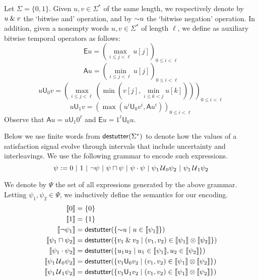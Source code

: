 Let $\Sigma = \{0,1\}$.
Given $u,v \in \Sigma^*$ of the same length, we respectively denote by $u \mathbin{\&} v$ the `bitwise and' operation, and by $\mathord{\sim} u$ the `bitwise negation' operation.
In addition, given a nonempty words $u,v \in \Sigma^*$ of length $\ell$, we define as auxiliary bitwise temporal operators as follows:
$$ \mathsf{E} u = \left( \max_{i \leq j < \ell} u[j] \right)_{0 \leq i < \ell} $$
$$ \mathsf{A} u = \left( \min_{i \leq j < \ell} u[j] \right)_{0 \leq i < \ell} $$
$$ u \mathsf{U}_0 v = \left( \max_{i \leq j < \ell} \left( \min \left( v[j], \min_{i \leq k < j} u[k] \right) \right) \right)_{0 \leq i < \ell} $$
$$ u \mathsf{U}_1 v = \left( \max \left( u^i \mathsf{U}_0 v^i, \mathsf{A} u^i \right) \right)_{0 \leq i < \ell} $$
Observe that $\mathsf{A} u = u \mathsf{U}_1 0^\ell$ and $\mathsf{E} u = 1^\ell \mathsf{U}_0 u$.

Below we use finite words from $\mathsf{destutter}(\Sigma^*)$ to denote how the values of a satisfaction signal evolve through intervals that include uncertainty and interleavings.
We use the following grammar to encode such expressions. 
$$ \psi := 0 ~|~ 1 ~|~ \lnot \psi ~|~ \psi \sqcap \psi  ~|~ \psi \cdot \psi ~|~ \psi_1 \,\mathcal{U}\,_{\!0} \psi_2 ~|~ \psi_1 \,\mathcal{U}\,_{\!1} \psi_2 $$  %

We denote by $\Psi$ the set of all expressions generated by the above grammar.
Letting $\psi_1, \psi_2 \in \Psi$, we inductively define the semantics for our encoding.
\begin{align*}
		\llbracket 0 \rrbracket &=  \{ 0 \} \\
		\llbracket 1 \rrbracket &=  \{ 1 \} \\
		\llbracket \lnot \psi_1 \rrbracket &= \destutter(\{ \BitNeg u \st u \in \llbracket \psi_1 \rrbracket \}) \\
		\llbracket \psi_1 \sqcap \psi_2 \rrbracket &= \destutter(\{ v_1 \BitAnd v_2 \st (v_1,v_2) \in \llbracket \psi_1 \rrbracket \otimes \llbracket \psi_2 \rrbracket \}) \\
		\llbracket \psi_1 \cdot \psi_2 \rrbracket &= \destutter(\{ u_1 u_2 \st u_1 \in \llbracket \psi_1 \rrbracket, u_2 \in \llbracket \psi_2 \rrbracket \}) \\
		\llbracket \psi_1 \until_{\!0} \psi_2 \rrbracket &= \destutter(\{ v_1 \mathsf{U}_0 v_2  \st (v_1,v_2) \in \llbracket \psi_1 \rrbracket \otimes \llbracket \psi_2 \rrbracket \}) \\
		\llbracket \psi_1 \until_{\!1} \psi_2 \rrbracket &= \destutter(\{ v_1 \mathsf{U}_1 v_2  \st (v_1,v_2) \in \llbracket \psi_1 \rrbracket \otimes \llbracket \psi_2 \rrbracket \}) \\
\end{align*}

